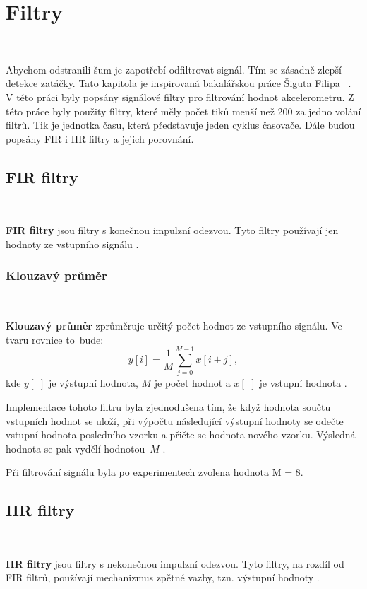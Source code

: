 \chapter{Filtry}
\label{sec:Filters}
\

Abychom odstranili šum je zapotřebí odfiltrovat signál. Tím se zásadně zlepší
detekce zatáčky. Tato kapitola je inspirovaná bakalářskou práce Šiguta Filipa
~\cite{krokomer}.
V této práci byly popsány signálové filtry pro filtrování hodnot akcelerometru. Z této práce byly použity filtry, které měly počet tiků menší než 200 za jedno volání filtrů. Tik je jednotka času, která představuje jeden cyklus časovače. Dále budou popsány FIR i IIR filtry a jejich porovnání.

\section{FIR filtry}\

\textbf{FIR filtry} jsou filtry s konečnou impulzní odezvou. Tyto filtry používají
jen hodnoty ze vstupního signálu \cite{FIR}.

\subsection{Klouzavý průměr}\

\textbf{Klouzavý průměr} zprůměruje určitý počet hodnot ze vstupního signálu. Ve
tvaru rovnice to~bude:
\begin{equation}
y[i] = \frac{1}{M}\sum_{j = 0}^{M - 1}x[i+j],
\end{equation}
kde $y[\,\,]$ je výstupní hodnota, $M$ je počet hodnot a $x[\,\,]$ je vstupní
hodnota \cite{Filters}.

Implementace tohoto filtru byla zjednodušena tím, že když hodnota součtu vstupních
hodnot se uloží, při výpočtu následující výstupní hodnoty se odečte vstupní hodnota
posledního vzorku a přičte se hodnota nového vzorku. Výsledná hodnota se pak vydělí
hodnotou~$M$ \cite{krokomer}.

Při filtrování signálu byla po experimentech zvolena hodnota M = 8.

\section{IIR filtry}\

\textbf{IIR filtry} jsou filtry s nekonečnou impulzní odezvou. Tyto filtry, na
rozdíl od FIR filtrů, používají mechanizmus zpětné vazby, tzn. výstupní
hodnoty \cite{IIR}.


